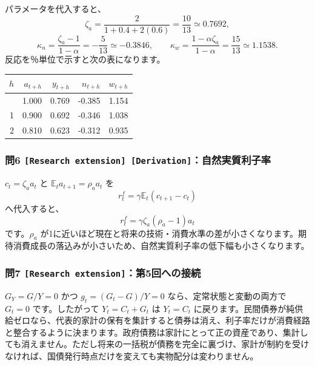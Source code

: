 \documentclass[
  japanese,
  lualatex,
  ja=standard,
  11pt,
  a4paper]{ltjsarticle}
\newcounter{none} %
\begin{document}
パラメータを代入すると、 \[
\zeta_a=\frac{2}{1+0.4+2(0.6)}=\frac{10}{13}\simeq0.7692,
\] \[
\kappa_n=\frac{\zeta_a-1}{1-\alpha}=-\frac5{13}\simeq-0.3846,
\qquad
\kappa_w=\frac{1-\alpha\zeta_a}{1-\alpha}=\frac{15}{13}\simeq1.1538.
\] 反応を％単位で示すと次の表になります。

{\def\LTcaptype{none} %
\begin{longtable}[]{@{}rrrrr@{}}
\toprule\noalign{}
\(h\) & \(a_{t+h}\) & \(y_{t+h}\) & \(n_{t+h}\) & \(w_{t+h}\) \\
\midrule\noalign{}
\endhead
\bottomrule\noalign{}
\endlastfoot
0 & 1.000 & 0.769 & -0.385 & 1.154 \\
1 & 0.900 & 0.692 & -0.346 & 1.038 \\
2 & 0.810 & 0.623 & -0.312 & 0.935 \\
\end{longtable}
}

\subsubsection{\texorpdfstring{問6
\texttt{{[}Research\ extension{]}\ {[}Derivation{]}}：自然実質利子率}{問6 {[}Research extension{]} {[}Derivation{]}：自然実質利子率}}\label{ux554f6-research-extension-derivationux81eaux7136ux5b9fux8ceaux5229ux5b50ux7387}

\(c_t=\zeta_a a_t\) と \(\mathbb E_ta_{t+1}=\rho_a a_t\) を \[
r_t^f=\gamma\mathbb E_t(c_{t+1}-c_t)
\] へ代入すると、 \[
r_t^f=\gamma\zeta_a(\rho_a-1)a_t
\] です。\(\rho_a\)
が1に近いほど現在と将来の技術・消費水準の差が小さくなります。期待消費成長の落込みが小さいため、自然実質利子率の低下幅も小さくなります。

\subsubsection{\texorpdfstring{問7
\texttt{{[}Research\ extension{]}}：第5回への接続}{問7 {[}Research extension{]}：第5回への接続}}\label{ux554f7-research-extensionux7b2c5ux56deux3078ux306eux63a5ux7d9a}

\(G_Y=G/Y=0\) かつ \(g_t=(G_t-G)/Y=0\) なら、定常状態と変動の両方で
\(G_t=0\) です。したがって \(Y_t=C_t+G_t\) は \(Y_t=C_t\)
に戻ります。民間債券が純供給ゼロなら、代表的家計の保有を集計すると債券は消え、利子率だけが消費経路と整合するように決まります。政府債務は家計にとって正の資産であり、集計しても消えません。ただし将来の一括税が債務を完全に裏づけ、家計が制約を受けなければ、国債発行時点だけを変えても実物配分は変わりません。
\end{document}
